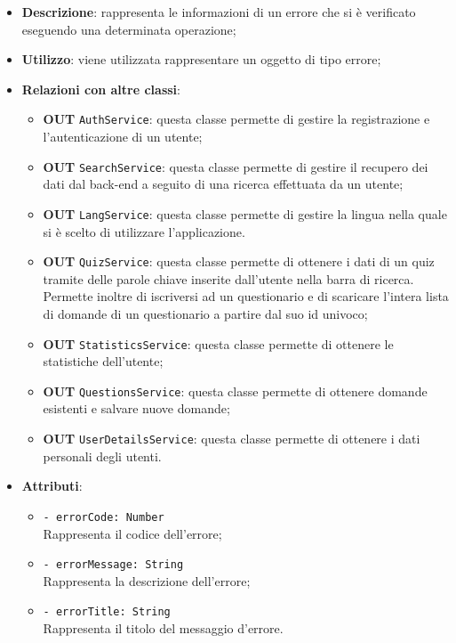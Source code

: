 		\begin{itemize}
			\item \textbf{Descrizione}: rappresenta le informazioni di un errore che si è verificato eseguendo una determinata operazione;
			\item \textbf{Utilizzo}: viene utilizzata rappresentare un oggetto di tipo errore;
			\item \textbf{Relazioni con altre classi}: 
			\begin{itemize}
			 	\item \textbf{OUT} \texttt{AuthService}: questa classe permette di gestire la registrazione e l'autenticazione di un utente;
			 	\item \textbf{OUT} \texttt{SearchService}: questa classe permette di gestire il recupero dei dati dal back-end a seguito di una ricerca effettuata da un utente;
			 	\item \textbf{OUT} \texttt{LangService}: questa classe permette di gestire la lingua nella quale si è scelto di utilizzare l'applicazione.
			 	\item \textbf{OUT} \texttt{QuizService}: questa classe permette di ottenere i dati di un quiz tramite delle parole chiave inserite dall'utente nella barra di ricerca. Permette inoltre di iscriversi ad un questionario e di scaricare l'intera lista di domande di un questionario a partire dal suo id univoco;
			 	\item \textbf{OUT} \texttt{StatisticsService}: questa classe permette di ottenere le statistiche dell'utente;
		 		\item \textbf{OUT} \texttt{QuestionsService}: questa classe permette di ottenere domande esistenti e salvare nuove domande;
	 			\item \textbf{OUT} \texttt{UserDetailsService}: questa classe permette di ottenere i dati personali degli utenti.
			\end{itemize}
			\item \textbf{Attributi}: 
			\begin{itemize}
				\item \texttt{- errorCode: Number} \\ 
				Rappresenta il codice dell'errore;
				\item \texttt{- errorMessage: String} \\ 
				Rappresenta la descrizione dell'errore; 
				\item \texttt{- errorTitle: String}\\ 
				Rappresenta il titolo del messaggio d'errore.
			\end{itemize}

\end{itemize}
